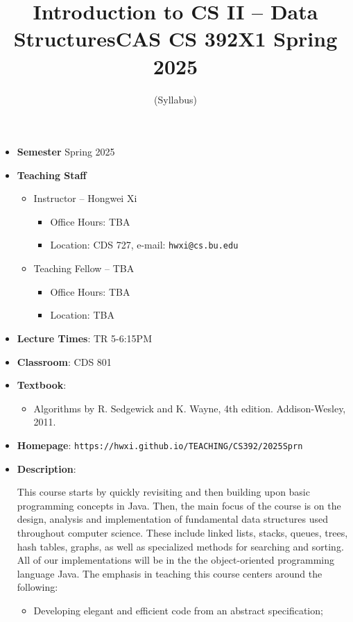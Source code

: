 \documentclass[11pt]{article}
\title{Introduction to CS II -- Data Structures\break CAS CS 392X1 Spring 2025}
\author{(Syllabus)}
\date{}
\begin{document}
\maketitle
\thispagestyle{empty}

\begin{itemize}
\item {\bf Semester} Spring 2025
\item {\bf Teaching Staff}
\begin{itemize}
\item
Instructor -- Hongwei Xi
\begin{itemize}
\item
Office Hours: TBA
\item
Location: CDS 727, e-mail: \texttt{hwxi@cs.bu.edu}
\end{itemize}

\item
Teaching Fellow -- TBA
\begin{itemize}
\item
Office Hours: TBA
\item
Location: TBA
\end{itemize}
\end{itemize}

\item {\bf Lecture Times}: TR 5-6:15PM
\item {\bf Classroom}: CDS 801
\item {\bf Textbook}:\kern6pt
\begin{itemize}
\item
Algorithms by R. Sedgewick and K. Wayne, 4th edition. Addison-Wesley, 2011.
\end{itemize}

\item {\bf Homepage}:
{\tt  https://hwxi.github.io/TEACHING/CS392/2025Sprn}

\item {\bf Description}:

This course starts by quickly revisiting and then building upon basic
programming concepts in Java. Then, the main focus of the course is on
the design, analysis and implementation of fundamental data structures
used throughout computer science. These include linked lists, stacks,
queues, trees, hash tables, graphs, as well as specialized methods for
searching and sorting. All of our implementations will be in the the
object-oriented programming language Java. The emphasis in teaching
this course centers around the following:

\begin{itemize}
\item
Developing elegant and efficient code from an abstract specification;


\end{itemize}
\end{itemize}
\end{document}
